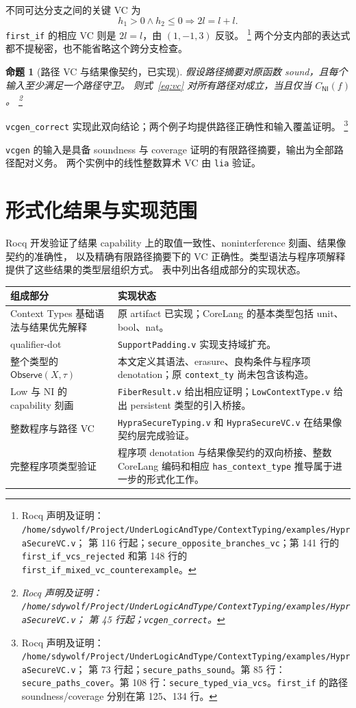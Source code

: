\documentclass[UTF8,a4paper,11pt,fontset=fandol]{ctexart}
\newcommand{\Observe}{\ensuremath{\mathsf{Observe}}}
\newcommand{\NI}{\mathsf{NI}}
\newcommand{\rocqnote}[3]{%
  \footnote{Rocq 声明及证明：
  \nolinkurl{/home/sdywolf/Project/UnderLogicAndType/#1}；
  第 #2 行起；#3。}}
\newtheorem{proposition}[definition]{命题}
\begin{document}
不同可达分支之间的关键 VC 为
\[
 h_1>0\land h_2\le0\Longrightarrow 2l=l+l.
\]
\texttt{first\_if} 的相应 VC 则是 $2l=l$，由 $(1,-1,3)$ 反驳。\rocqnote{ContextTyping/examples/HypraSecureVC.v}{116}{\texttt{secure\_opposite\_branches\_vc}；第 141 行的 \texttt{first\_if\_vcs\_rejected} 和第 148 行的 \texttt{first\_if\_mixed\_vc\_counterexample}}
两个分支内部的表达式都不提秘密，也不能省略这个跨分支检查。

\begin{proposition}[路径 VC 与结果像契约，已实现]
假设路径摘要对原函数 sound，且每个输入至少满足一个路径守卫。
则式~\eqref{eq:vc} 对所有路径对成立，当且仅当 $C_{\NI}(f)$。\rocqnote{ContextTyping/examples/HypraSecureVC.v}{45}{\texttt{vcgen\_correct}}
\end{proposition}
\texttt{vcgen\_correct} 实现此双向结论；两个例子均提供路径正确性和输入覆盖证明。\rocqnote{ContextTyping/examples/HypraSecureVC.v}{73}{\texttt{secure\_paths\_sound}。第 85 行：\texttt{secure\_paths\_cover}。第 108 行：\texttt{secure\_typed\_via\_vcs}。\texttt{first\_if} 的路径 soundness/coverage 分别在第 125、134 行}

\texttt{vcgen} 的输入是具备 soundness 与 coverage 证明的有限路径摘要，输出为全部路径配对义务。
两个实例中的线性整数算术 VC 由 \texttt{lia} 验证。

\section{形式化结果与实现范围}

Rocq 开发验证了结果 capability 上的取值一致性、noninterference 刻画、结果像契约的准确性，
以及精确有限路径摘要下的 VC 正确性。类型语法与程序项解释提供了这些结果的类型层组织方式。
表中列出各组成部分的实现状态。

\begin{center}
\begin{tabularx}{\textwidth}{@{}p{}X@{}}
\toprule
组成部分 & 实现状态\\
\midrule
Context Types 基础语法与结果优先解释 & 原 artifact 已实现；CoreLang 的基本类型包括 unit、bool、nat。\\
qualifier-dot & \texttt{SupportPadding.v} 实现支持域扩充。\\
整个类型的 $\Observe(X,\tau)$ & 本文定义其语法、erasure、良构条件与程序项 denotation；原 \texttt{context\_ty} 尚未包含该构造。\\
Low 与 NI 的 capability 刻画 & \texttt{FiberResult.v} 给出相应证明；\texttt{LowContextType.v} 给出 persistent 类型的引入桥接。\\
整数程序与路径 VC & \texttt{HypraSecureTyping.v} 和 \texttt{HypraSecureVC.v} 在结果像契约层完成验证。\\
完整程序项类型验证 & 程序项 denotation 与结果像契约的双向桥接、整数 CoreLang 编码和相应 \texttt{has\_context\_type} 推导属于进一步的形式化工作。\\
\bottomrule
\end{tabularx}
\end{center}
\end{document}
